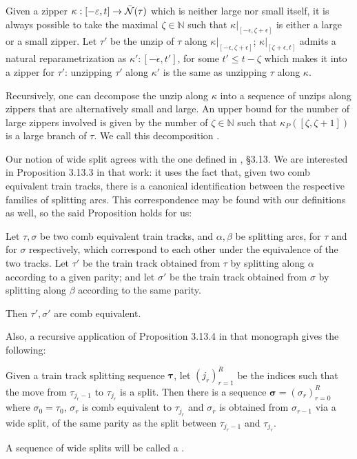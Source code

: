 \begin{rmk}
Given a zipper $\kappa:[-\varepsilon,t]\rightarrow\bar{{\mathcal N}}(\tau)$ which is neither large nor small itself, it is always possible to take the maximal $\zeta\in \mathbb N$ such that $\kappa|_{[-\epsilon,\zeta+\epsilon]}$ is either a large or a small zipper. Let $\tau'$ be the unzip of $\tau$ along $\kappa|_{[-\epsilon,\zeta+\epsilon]}$; $\kappa|_{[\zeta+\epsilon, t]}$ admits a natural reparametrization as $\kappa':[-\epsilon,t']$, for some $t'\leq t-\zeta$ which makes it into a zipper for $\tau'$: unzipping $\tau'$ along $\kappa'$ is the same as unzipping $\tau$ along $\kappa$. 

Recursively, one can decompose the unzip along $\kappa$ into a sequence of unzips along zippers that are alternatively small and large. An upper bound for the number of large zippers involved is given by the number of $\zeta\in \mathbb N$ such that $\kappa_P([\zeta,\zeta+1])$ is a large branch of $\tau$. We call this decomposition .
\end{rmk}

Our notion of wide split agrees with the one defined in \cite{mosher}, \S 3.13. We are interested in Proposition 3.13.3 in that work: it uses the fact that, given two comb equivalent train tracks, there is a canonical identification between the respective families of splitting arcs. This correspondence may be found with our definitions as well, so the said Proposition holds for us:

\begin{prop}\label{prp:combpersistence}
Let $\tau,\sigma$ be two comb equivalent train tracks, and $\alpha,\beta$ be splitting arcs, for $\tau$ and for $\sigma$ respectively, which correspond to each other under the equivalence of the two tracks. Let $\tau'$ be the train track obtained from $\tau$ by splitting along $\alpha$ according to a given parity; and let $\sigma'$ be the train track obtained from $\sigma$ by splitting along $\beta$ according to the same parity.

Then $\tau',\sigma'$ are comb equivalent.
\end{prop}

Also, a recursive application of Proposition 3.13.4 in that monograph gives the following:
\begin{prop}\label{prp:deleteslidings}
Given a train track splitting sequence $\bm\tau$, let $(j_r)_{r=1}^R$ be the indices such that the move from $\tau_{j_r-1}$ to $\tau_{j_r}$ is a split. Then there is a sequence $\bm\sigma=(\sigma_r)_{r=0}^R$ where $\sigma_0=\tau_0$, $\sigma_r$ is comb equivalent to $\tau_{j_r}$ and $\sigma_r$ is obtained from $\sigma_{r-1}$ via a wide split, of the same parity as the split between $\tau_{j_r-1}$ and $\tau_{j_r}$.
\end{prop}
A sequence of wide splits will be called a .


